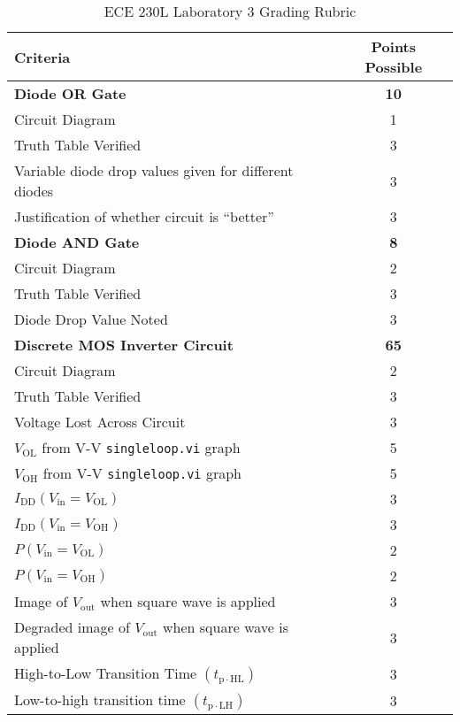 \documentclass[12pt]{../manual}
\begin{document}
%
\newpage
\def\arraystretch{1.2}
{}
\hspace{0pt}
\vfill %
\begin{table}[ht!]
\caption{ECE 230L Laboratory 3 Grading Rubric}
\centering
\begin{tabular}{l|c} \hline
Criteria & Points Possible \\ \hline \hline
\textbf{Diode OR Gate}			& \textbf{10} \\
Circuit Diagram 				& 1 \\
Truth Table Verified			& 3 \\
Variable diode drop values given for different diodes & 3 \\
Justification of whether circuit is ``better'' & 3 \\ \hline
\textbf{Diode AND Gate}			& \textbf{8} \\
Circuit Diagram 				& 2 \\
Truth Table Verified			& 3 \\
Diode Drop Value Noted			& 3 \\ \hline
\textbf{Discrete MOS Inverter Circuit}		& \textbf{65} \\
Circuit Diagram 				& 2 \\
Truth Table Verified			& 3 \\
Voltage Lost Across Circuit 	& 3 \\
$V_\mathrm{OL}$ from V-V {\tt singleloop.vi} graph 	& 5 \\
$V_\mathrm{OH}$ from V-V {\tt singleloop.vi} graph	& 5 \\
$I_\mathrm{DD}(V_\mathrm{in} = V_\mathrm{OL})$ & 3 \\
$I_\mathrm{DD}(V_\mathrm{in} = V_\mathrm{OH})$ & 3 \\
$P(V_\mathrm{in} = V_\mathrm{OL})$ & 2 \\
$P(V_\mathrm{in} = V_\mathrm{OH})$ & 2 \\
Image of $V_\mathrm{out}$ when square wave is applied & 3 \\
Degraded image of $V_\mathrm{out}$ when square wave is applied & 3 \\
High-to-Low Transition Time $(t_\mathrm{p \cdot HL})$ & 3 \\
Low-to-high transition time $(t_\mathrm{p \cdot LH})$ & 3 \\

\end{tabular}
\end{table}
\end{document}
